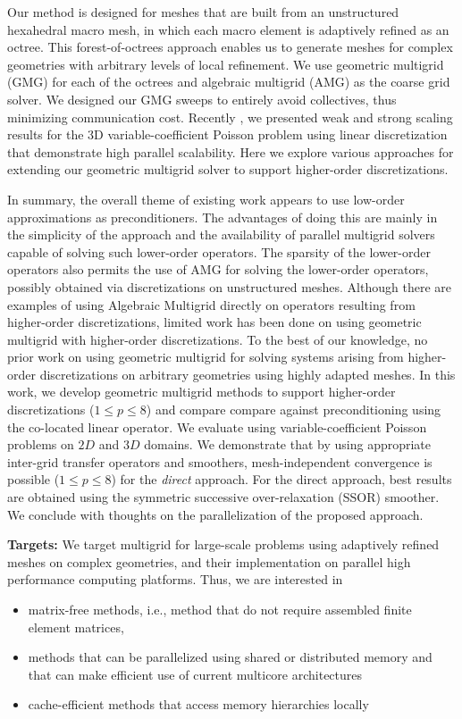 \documentclass[times]{nlaauth}
\begin{document}
Our method is designed for meshes that are built from an unstructured
hexahedral macro mesh, in which each macro element is adaptively
refined as an octree. This forest-of-octrees approach enables us to
generate meshes for complex geometries with arbitrary levels of local
refinement. We use geometric multigrid (GMG) for each of the octrees
and algebraic multigrid (AMG) as the coarse grid solver. We designed
our GMG sweeps to entirely avoid collectives, thus minimizing
communication cost. Recently \cite{sundar12}, we presented weak and strong scaling
results for the 3D variable-coefficient Poisson problem using linear
discretization that demonstrate high parallel scalability. Here we
explore various approaches for extending our geometric multigrid
solver to support higher-order discretizations.


In summary, the overall theme of existing work appears to use
low-order approximations as preconditioners.  The advantages of doing
this are mainly in the simplicity of the approach and the availability
of parallel multigrid solvers capable of solving such lower-order
operators. The sparsity of the lower-order operators also permits the
use of AMG for solving the lower-order operators, possibly obtained
via discretizations on unstructured meshes.  Although there are
examples of using Algebraic Multigrid directly on operators resulting
from higher-order discretizations, limited work has been done on using
geometric multigrid with higher-order discretizations. To the best of
our knowledge, no prior work on using geometric multigrid for solving
systems arising from higher-order discretizations on arbitrary
geometries using highly adapted meshes.  In this work, we develop
geometric multigrid methods to support higher-order discretizations
($1\le p\le 8$) and compare compare against preconditioning using the
co-located linear operator. We evaluate using variable-coefficient
Poisson problems on $2D$ and $3D$ domains. We demonstrate that by
using appropriate inter-grid transfer operators and smoothers,
mesh-independent convergence is possible ($1\le p\le8$) for the {\em
direct} approach. For the direct approach, best results are obtained
using the symmetric successive over-relaxation (SSOR) smoother. We
conclude with thoughts on the parallelization of the proposed
approach.


{\bf Targets:} We target multigrid for large-scale problems using
adaptively refined meshes on complex geometries, and their
implementation on parallel high performance computing platforms. Thus,
we are interested in
\begin{itemize}
\item matrix-free methods, i.e., method that do not require assembled
  finite element matrices,
\item methods that can be parallelized using shared or distributed
  memory and that can make efficient use of current multicore
  architectures
\item cache-efficient methods that access memory hierarchies locally
\end{itemize}
\end{document}
